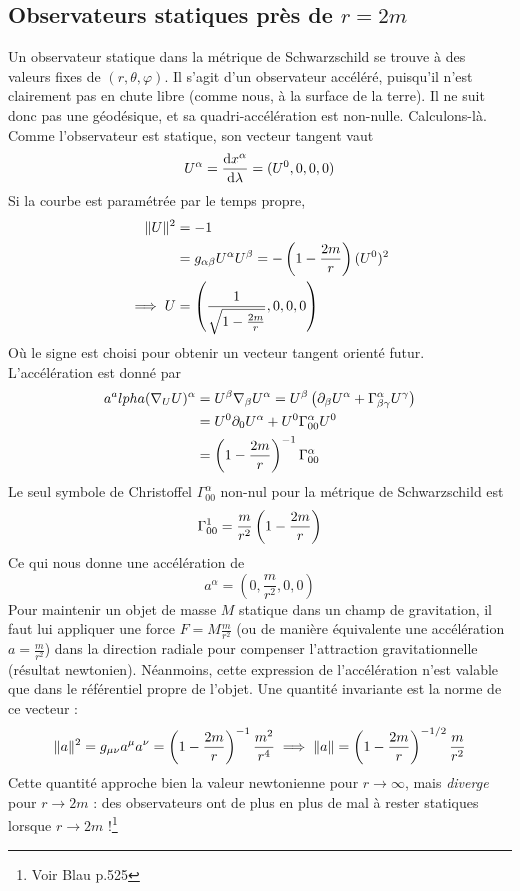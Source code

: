 \subsection{Observateurs statiques près de $r=2m$}
Un observateur statique dans la métrique de Schwarzschild se trouve à des valeurs fixes de $(r,\theta, \varphi)$. Il s'agit d'un observateur accéléré, puisqu'il n'est clairement pas en chute libre (comme nous, à la surface de la terre). Il ne suit donc pas une géodésique, et sa quadri-accélération est non-nulle. Calculons-là. Comme l'observateur est statique, son vecteur tangent vaut
\begin{equation}
    U^\alpha = \frac{\mathrm{d} x^\alpha}{\mathrm{d} \lambda} = (U^0,0,0,0)
\end{equation}
Si la courbe est paramétrée par le temps propre, 
\begin{align}
    \lVert U \rVert^2 &= -1\\
    &= g_{\alpha\beta} U^\alpha U^\beta = - \left( 1 - \frac{2m}{r} \right) (U^0)^2\\
    \implies U &= \left( \frac{1}{\sqrt{1 - \frac{2m}{r}}},0,0,0 \right)
\end{align}
Où le signe est choisi pour obtenir un vecteur tangent orienté futur. L'accélération est donné par
\begin{align}
    a^alpha (\nabla_U U)^\alpha &= U^\beta \nabla_\beta U^\alpha = U^\beta \left( \partial_\beta U^\alpha + \Gamma^\alpha_{\beta \gamma} U^\gamma \right)\\
    &= U^0 \partial_0 U^\alpha + U^0 \Gamma^\alpha_{00}U^0\\
    &= \left( 1 - \frac{2m}{r} \right)^{-1} \Gamma^\alpha_{00}
\end{align}
Le seul symbole de Christoffel $\Gamma^\alpha_{00}$ non-nul pour la métrique de Schwarzschild est 
\begin{equation}
    \Gamma^1_{00} = \frac{m}{r^2} \left( 1 - \frac{2m}{r} \right) 
\end{equation}
Ce qui nous donne une accélération de
\begin{equation}
    a^\alpha = (0, \frac{m}{r^2},0,0)
\end{equation}
Pour maintenir un objet de masse $M$ statique dans un champ de gravitation, il faut lui appliquer une force $F = M \frac{m}{r^2}$ (ou de manière équivalente une accélération $a = \frac{m}{r^2}$) dans la direction radiale pour compenser l'attraction gravitationnelle (résultat newtonien). Néanmoins, cette expression de l'accélération n'est valable que dans le référentiel propre de l'objet. Une quantité invariante est la norme de ce vecteur : 
\begin{equation}
    \lVert a \rVert^2 = g_{\mu\nu} a^\mu a^\nu = \left( 1 - \frac{2m}{r} \right)^{-1} \frac{m^2}{r^4} \implies \lVert a \rVert = \left( 1 - \frac{2m}{r} \right)^{-1/2} \frac{m}{r^2}
\end{equation}
Cette quantité approche bien la valeur newtonienne pour $r\to \infty$, mais \emph{diverge} pour $r \to 2m$ : des observateurs ont de plus en plus de mal à rester statiques lorsque $r \to 2m$ !\footnote{Voir Blau p.525}
